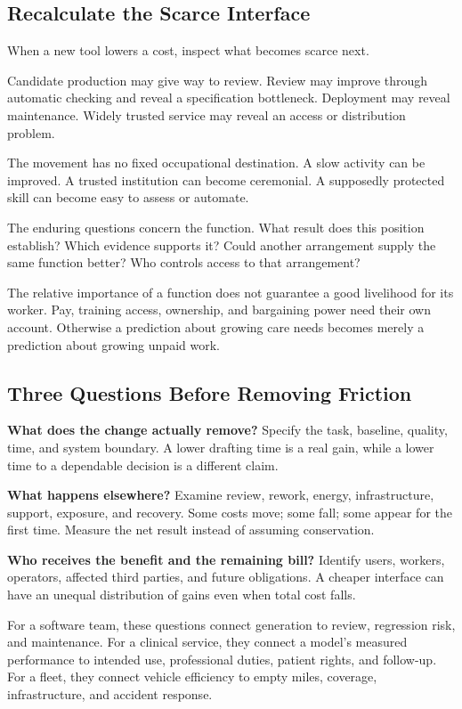 \documentclass[11pt,openany]{book}
\begin{document}
\subsection{Recalculate the Scarce Interface}

When a new tool lowers a cost, inspect what becomes scarce next.

Candidate production may give way to review. Review may improve through automatic checking and reveal a specification bottleneck. Deployment may reveal maintenance. Widely trusted service may reveal an access or distribution problem.

The movement has no fixed occupational destination. A slow activity can be improved. A trusted institution can become ceremonial. A supposedly protected skill can become easy to assess or automate.

The enduring questions concern the function. What result does this position establish? Which evidence supports it? Could another arrangement supply the same function better? Who controls access to that arrangement?

The relative importance of a function does not guarantee a good livelihood for its worker. Pay, training access, ownership, and bargaining power need their own account. Otherwise a prediction about growing care needs becomes merely a prediction about growing unpaid work.

\subsection{Three Questions Before Removing Friction}

\textbf{What does the change actually remove?} Specify the task, baseline, quality, time, and system boundary. A lower drafting time is a real gain, while a lower time to a dependable decision is a different claim.

\textbf{What happens elsewhere?} Examine review, rework, energy, infrastructure, support, exposure, and recovery. Some costs move; some fall; some appear for the first time. Measure the net result instead of assuming conservation.

\textbf{Who receives the benefit and the remaining bill?} Identify users, workers, operators, affected third parties, and future obligations. A cheaper interface can have an unequal distribution of gains even when total cost falls.

For a software team, these questions connect generation to review, regression risk, and maintenance. For a clinical service, they connect a model's measured performance to intended use, professional duties, patient rights, and follow-up. For a fleet, they connect vehicle efficiency to empty miles, coverage, infrastructure, and accident response.
\end{document}
